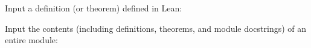 %



Input a definition (or theorem) defined in Lean:


Input the contents (including definitions, theorems, and module docstrings) of an entire module:

